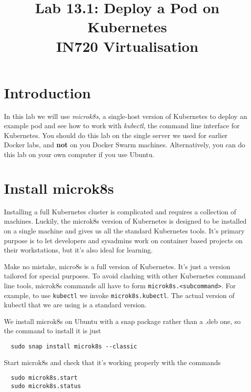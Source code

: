 \documentclass{article}
\begin{document}
\title{Lab 13.1: Deploy a Pod on Kubernetes\\IN720 Virtualisation}
\date{}
\maketitle

\section*{Introduction}
In this lab we will use \emph{microk8s}, a single-host version of Kubernetes to deploy an example pod and see how to work with \emph{kubectl}, the command line interface for Kubernetes. You should do this lab on the single server we used for earlier Docker labs, and \textbf{not} on you Docker Swarm machines. Alternatively, you can do this lab on your own computer if you use Ubuntu.

\section{Install microk8s}
Installing a full Kubernetes cluster is complicated and requires a collection of machines. Luckily, the microk8s version of Kubernetes is designed to be installed on a single machine and gives us all the standard Kubernetes tools. It's primary purpose is to let developers and sysadmins work on container based projects on their workstations, but it's also ideal for learning. 

Make no mistake, micro8s is a full version of Kubernetes. It's just a version tailored for special purposes. To avoid clashing with other Kubernetes command line tools, microk8s commands all have to form \texttt{microk8s.<subcommand>}. For example, to use \texttt{kubectl} we invoke \texttt{microk8s.kubectl}. The actual version of kubectl that we are using is a standard version.

We install microk8s on Ubuntu with a snap package rather than a .deb one, so the command to install it is just

\begin{verbatim}
  sudo snap install microk8s --classic
\end{verbatim}

Start microk8s and check that it's working properly with the commands

\begin{verbatim}
  sudo microk8s.start
  sudo microk8s.status
\end{verbatim}
\end{document}

